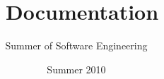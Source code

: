 \documentclass{report}
\begin{document}
\title{\VTank\ Documentation}
\author{Summer of Software Engineering}
\date{Summer 2010}
\maketitle


\tableofcontents
\newpage
{}


















\end{document}
